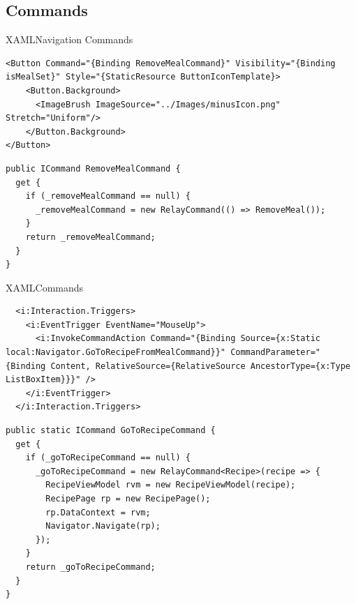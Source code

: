 
\subsection{Commands} 
\begin{frame}[fragile]{XAML}{Navigation Commands}

\begin{lstlisting}
<Button Command="{Binding RemoveMealCommand}" Visibility="{Binding isMealSet}" Style="{StaticResource ButtonIconTemplate}>
    <Button.Background>
      <ImageBrush ImageSource="../Images/minusIcon.png" Stretch="Uniform"/>
    </Button.Background>
</Button>
\end{lstlisting}

\begin{lstlisting}
public ICommand RemoveMealCommand {
  get {
    if (_removeMealCommand == null) {
      _removeMealCommand = new RelayCommand(() => RemoveMeal());
    }
    return _removeMealCommand;
  }
}
\end{lstlisting}
\end{frame}


\begin{frame}[fragile]{XAML}{Commands}
\begin{lstlisting}
  <i:Interaction.Triggers>
    <i:EventTrigger EventName="MouseUp">
      <i:InvokeCommandAction Command="{Binding Source={x:Static local:Navigator.GoToRecipeFromMealCommand}}" CommandParameter="{Binding Content, RelativeSource={RelativeSource AncestorType={x:Type ListBoxItem}}}" />
    </i:EventTrigger>
  </i:Interaction.Triggers>
\end{lstlisting}

\begin{lstlisting}
public static ICommand GoToRecipeCommand {
  get {
    if (_goToRecipeCommand == null) {
      _goToRecipeCommand = new RelayCommand<Recipe>(recipe => {
        RecipeViewModel rvm = new RecipeViewModel(recipe);
        RecipePage rp = new RecipePage();
        rp.DataContext = rvm;
        Navigator.Navigate(rp);
      });
    }
    return _goToRecipeCommand;
  }
}
\end{lstlisting}
\end{frame}
